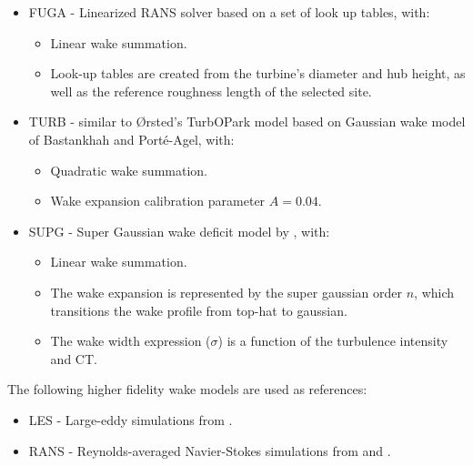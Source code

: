 \documentclass[a4paper,oneside]{article}
\begin{document}
\begin{itemize}
    \begin{itemize}
        \item Weighted sum wake summation.
        \item Crespo Hernandez turbulence model.
        \item Wake expansion parameter $k$ varies linearly with the local turbulence intensity, such that $k = a_1*I_{u,H,\infty} + a_2$, where $a1 = 0.38$ and $a2 = 0.004$.
        \item Redefinition of the wake width ($\sigma$) which includes an implementation of the near-wake length based on Vermeulen (1980).
    \end{itemize}
    \item FUGA - Linearized RANS solver based on a set of look up tables, with:
    \begin{itemize}
        \item Linear wake summation.
        \item Look-up tables are created from the turbine’s diameter and hub height, as well as the reference roughness length of the selected site.
    \end{itemize}
    \item TURB - similar to Ørsted's TurbOPark model based on Gaussian wake model of Bastankhah and Porté-Agel, with:
    \begin{itemize}
        \item Quadratic wake summation.
        \item Wake expansion calibration parameter $A = 0.04$.
    \end{itemize}
    \item SUPG - Super Gaussian wake deficit model by \citet{Blondel2020}, with:
    \begin{itemize}
        \item Linear wake summation.
        \item The wake expansion is represented by the super gaussian order $n$, which transitions the wake profile from top-hat to gaussian.
        \item The wake width expression ($\sigma$) is a function of the turbulence intensity and CT.
    \end{itemize}
\end{itemize}
\newpage
The following higher fidelity wake models are used as references:
\begin{itemize}
    \item LES - Large-eddy simulations from \citet{Laan13b}.
    \item RANS - Reynolds-averaged Navier-Stokes simulations from \citet{Laan13b} and \citet{Laan14c}.
\end{itemize}
\end{document}
